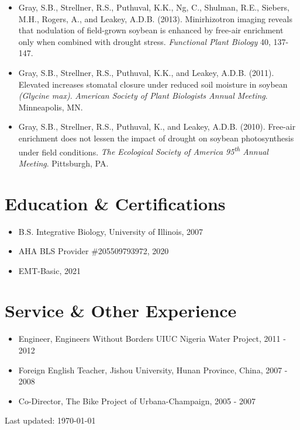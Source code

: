 \documentclass[letterpaper]{article}
\def\footerlink{}
\begin{document}
  \begin{itemize}

    \item Gray, S.B., Strellner, R.S., Puthuval, K.K., Ng, C., Shulman, R.E., Siebers, M.H., Rogers, A., and Leakey, A.D.B. (2013). Minirhizotron imaging reveals that nodulation of field-grown soybean is enhanced by free-air  enrichment only when combined with drought stress. {\it Functional Plant Biology} 40, 137-147.
    \item Gray, S.B., Strellner, R.S., Puthuval, K.K., and Leakey, A.D.B. (2011). Elevated  increases stomatal closure under reduced soil moisture in soybean {\it(Glycine max)}. {\it American Society of Plant Biologists Annual Meeting}. Minneapolis, MN.
    \item Gray, S.B., Strellner, R.S., Puthuval, K., and Leakey, A.D.B. (2010). Free-air  enrichment does not lessen the impact of drought on soybean photosynthesis under field conditions. {\it The Ecological Society of America 95\textsuperscript{th} Annual Meeting}. Pittsburgh, PA.

  \end{itemize}

\section*{Education \& Certifications}

  \begin{itemize}
    \item B.S. Integrative Biology, University of Illinois, 2007
    \item AHA BLS Provider \#205509793972, 2020
    \item EMT-Basic, 2021
  \end{itemize}

\section*{Service \& Other Experience}

  \begin{itemize}
      \item Engineer, Engineers Without Borders UIUC Nigeria Water Project, 2011 - 2012
      \item Foreign English Teacher, Jishou University, Hunan Province, China, 2007 - 2008
      \item Co-Director, The Bike Project of Urbana-Champaign, 2005 - 2007
  \end{itemize}

\bigskip

\begin{center}
  \begin{footnotesize}
    Last updated: \today \\
    \href{\footerlink}{\texttt{\footerlink}}
  \end{footnotesize}
\end{center}
\end{document}
